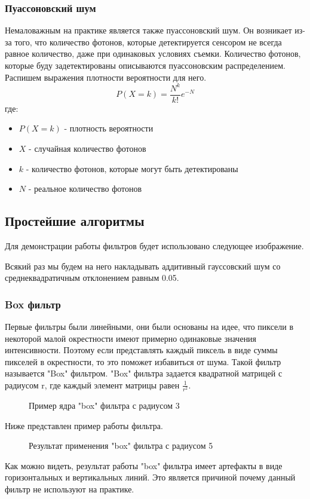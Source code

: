 \subsubsection{Пуассоновский шум}
Немаловажным на практике является также пуассоновский шум. Он возникает из-за того, что количество фотонов, которые детектируется сенсором не всегда равное количество, даже при одинаковых условиях съемки. Количество фотонов, которые буду задетектированы описываются пуассоновским распределением. Распишем выражения плотности вероятности для него.
\begin{equation}
	P(X=k)=\frac{N^k}{k!}e^{-N}
\end{equation}
где:
\begin{itemize}
	\item $P(X=k)$ - плотность вероятности
	\item $X$ - случайная количество фотонов
	\item $k$ - количество фотонов, которые могут быть детектированы 
	\item $N$ - реальное количество фотонов
\end{itemize}


\subsection{Простейшие алгоритмы}
Для демонстрации работы фильтров будет использовано следующее изображение.
\begin{figure}[H]\label{img:orig}
\end{figure}

Всякий раз  мы будем на него накладывать аддитивный гауссовский шум со среднеквадратичным отклонением равным 0.05.
\begin{figure}[H]\label{img:noised}
\end{figure}
\subsubsection{Box фильтр}
Первые фильтры были линейными, они были основаны на идее, что пиксели в некоторой малой окрестности имеют примерно одинаковые значения интенсивности. Поэтому если представлять каждый пиксель в виде суммы пикселей в окрестности, то это поможет избавиться от шума. Такой фильтр называется "Box" фильтром. "Box" фильтра задается квадратной матрицей с радиусом r, где каждый элемент матрицы равен $\frac{1}{r^2}$.
\begin{figure}[H]
	\label{img:kernelBox}
	\caption{Пример ядра "box" фильтра с радиусом 3}
\end{figure}
Ниже представлен пример работы фильтра.
\begin{figure}[H]
	\caption{Результат применения "box" фильтра с радиусом 5}
\end{figure}
Как можно видеть, результат работы "box"  фильтра имеет артефакты в виде горизонтальных и вертикальных линий. Это является причиной почему данный фильтр не используют на практике.
